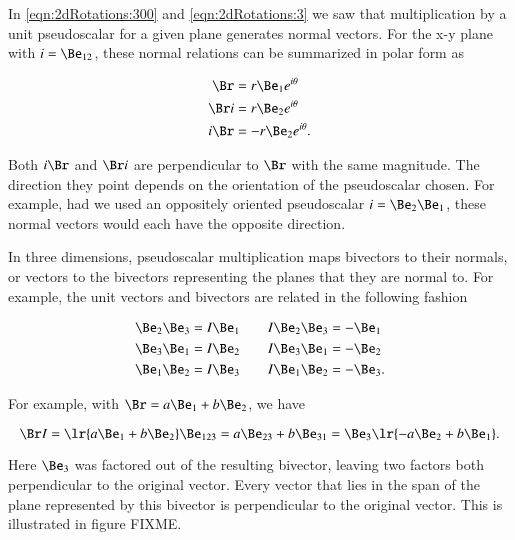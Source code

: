 %
%
In \cref{eqn:2dRotations:300} and \cref{eqn:2dRotations:3} we saw that multiplication by a unit pseudoscalar for a given plane generates normal vectors.  For the x-y plane with \( i = \Be_{12} \), these normal relations can be summarized in polar form as

\begin{equation}\label{eqn:dual:1620}
\begin{aligned}
\Br &= r \Be_1 e^{i\theta} \\
\Br i &= r \Be_2 e^{i\theta} \\
i \Br &= -r \Be_2 e^{i\theta}.
\end{aligned}
\end{equation}

Both \( i \Br \) and \( \Br i \) are perpendicular to \( \Br \) with the same magnitude.
The direction they point depends on the orientation of the pseudoscalar chosen.  For example,
had we used an oppositely oriented pseudoscalar \( i = \Be_2 \Be_1 \), these normal vectors would each have the opposite direction.

In three dimensions, pseudoscalar multiplication maps bivectors to their normals, or vectors to the bivectors representing the planes that they are normal to.  For example, the unit vectors and bivectors are related in the following fashion

\begin{equation}\label{eqn:products:1580}
\begin{aligned}
\Be_2 \Be_3 &= I \Be_1 \qquad I \Be_2 \Be_3 = -\Be_1 \\
\Be_3 \Be_1 &= I \Be_2 \qquad I \Be_3 \Be_1 = -\Be_2 \\
\Be_1 \Be_2 &= I \Be_3 \qquad I \Be_1 \Be_2 = -\Be_3.
\end{aligned}
\end{equation}

For example, with \( \Br = a \Be_1 + b \Be_2 \), we have

\begin{dmath}\label{eqn:dual:1640}
\Br I
=
\lr{ a \Be_1 + b \Be_2 } \Be_{123}
=
a \Be_{23} + b \Be_{31}
=
\Be_3 \lr{ -a \Be_{2} + b \Be_{1} }.
\end{dmath}

Here \( \Be_3 \) was factored out of the resulting bivector, leaving two factors both perpendicular to the original vector.  Every vector that lies in the span of the plane represented by this bivector is perpendicular to the original vector.
This is illustrated in figure FIXME.

